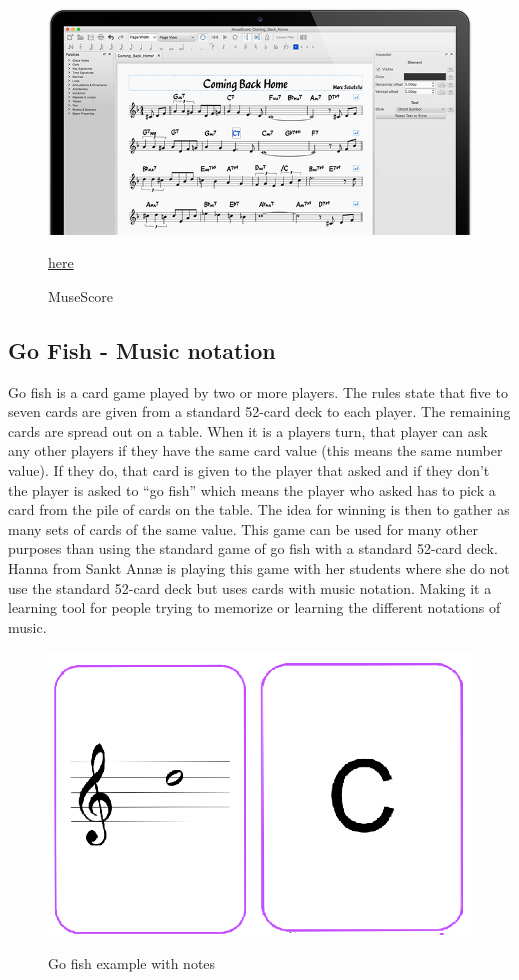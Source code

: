 \begin{figure}[H]
	\centering
	\includegraphics[width=0.8\linewidth]{figure/Analysis/musescore.png}
	\label{fig:MuseScore}
	\caption{MuseScore}
	\href{https://musescore.org/da}{\color{blue}here}
\end{figure}

\subsection{Go Fish - Music notation}
Go fish is a card game played by two or more players. The rules state that five to seven cards are given from a standard 52-card deck to each player. The remaining cards are spread out on a table. When it is a players turn, that player can ask any other players if they have the same card value (this means the same number value). If they do, that card is given to the player that asked and if they don’t the player is asked to “go fish” which means the player who asked has to pick a card from the pile of cards on the table. The idea for winning is then to gather as many sets of cards of the same value. This game can be used for many other purposes than using the standard game of go fish with a standard 52-card deck. Hanna from Sankt Annæ is playing this game with her students where she do not use the standard 52-card deck but uses cards with music notation. Making it a learning tool for people trying to memorize or learning the different notations of music. 

\begin{figure}[H]
	\centering
	\includegraphics[width=0.7\linewidth]{figure/Analysis/gofish}
	\label{fig:gofish}
	\caption{Go fish example with notes}
\end{figure}

